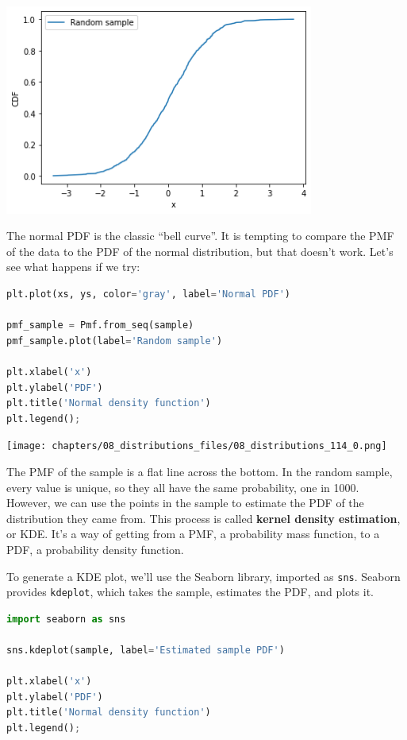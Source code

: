 \begin{center}
\includegraphics[width=4in]{chapters/08_distributions_files/08_distributions_112_0.png}
\end{center}

The normal PDF is the classic ``bell curve''. It is tempting to compare
the PMF of the data to the PDF of the normal distribution, but that
doesn't work. Let's see what happens if we try:

\begin{lstlisting}[language=Python,style=source]
plt.plot(xs, ys, color='gray', label='Normal PDF')

pmf_sample = Pmf.from_seq(sample)
pmf_sample.plot(label='Random sample')

plt.xlabel('x')
plt.ylabel('PDF')
plt.title('Normal density function')
plt.legend();
\end{lstlisting}

\begin{center}
\texttt{[image: chapters/08\_distributions\_files/08\_distributions\_114\_0.png]}
\end{center}

The PMF of the sample is a flat line across the bottom. In the random
sample, every value is unique, so they all have the same probability,
one in 1000. However, we can use the points in the sample to estimate
the PDF of the distribution they came from. This process is called
\textbf{kernel density estimation}, or KDE. It's a way of getting from a
PMF, a probability mass function, to a PDF, a probability density
function.

To generate a KDE plot, we'll use the Seaborn library, imported as
\passthrough{\lstinline!sns!}. Seaborn provides
\passthrough{\lstinline!kdeplot!}, which takes the sample, estimates the
PDF, and plots it.

\begin{lstlisting}[language=Python,style=source]
import seaborn as sns

sns.kdeplot(sample, label='Estimated sample PDF')

plt.xlabel('x')
plt.ylabel('PDF')
plt.title('Normal density function')
plt.legend();
\end{lstlisting}

